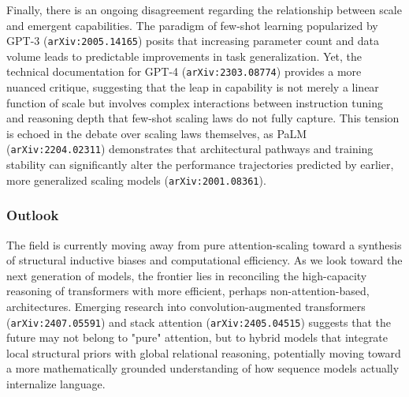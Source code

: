 \documentclass[11pt]{article}
\begin{document}
Finally, there is an ongoing disagreement regarding the relationship between scale and emergent capabilities. The paradigm of few-shot learning popularized by GPT-3 (\texttt{arXiv:2005.14165}) posits that increasing parameter count and data volume leads to predictable improvements in task generalization. Yet, the technical documentation for GPT-4 (\texttt{arXiv:2303.08774}) provides a more nuanced critique, suggesting that the leap in capability is not merely a linear function of scale but involves complex interactions between instruction tuning and reasoning depth that few-shot scaling laws do not fully capture. This tension is echoed in the debate over scaling laws themselves, as PaLM (\texttt{arXiv:2204.02311}) demonstrates that architectural pathways and training stability can significantly alter the performance trajectories predicted by earlier, more generalized scaling models (\texttt{arXiv:2001.08361}).

\subsubsection{Outlook}

The field is currently moving away from pure attention-scaling toward a synthesis of structural inductive biases and computational efficiency. As we look toward the next generation of models, the frontier lies in reconciling the high-capacity reasoning of transformers with more efficient, perhaps non-attention-based, architectures. Emerging research into convolution-augmented transformers (\texttt{arXiv:2407.05591}) and stack attention (\texttt{arXiv:2405.04515}) suggests that the future may not belong to "pure" attention, but to hybrid models that integrate local structural priors with global relational reasoning, potentially moving toward a more mathematically grounded understanding of how sequence models actually internalize language.
\end{document}
